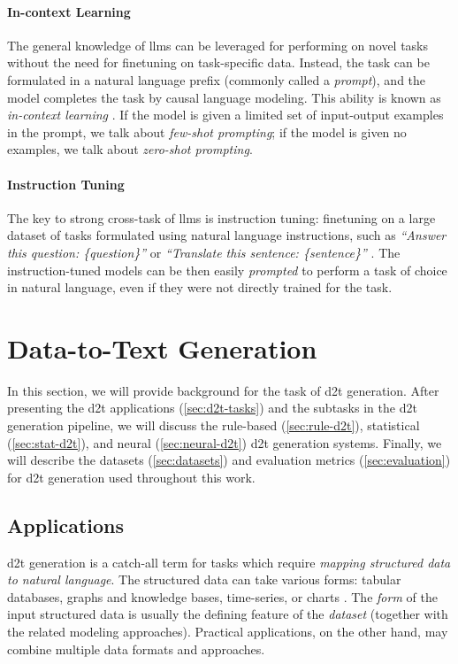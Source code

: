 \paragraph{In-context Learning} The general knowledge of \acp{llm} can be leveraged for performing on novel tasks without the need for finetuning on task-specific data. Instead, the task can be formulated in a natural language prefix (commonly called a \emph{prompt}), and the model completes the task by causal language modeling. This ability is known as \emph{in-context learning} \cite{brown2020language,dong2022survey}. If the model is given a limited set of input-output examples in the prompt, we talk about \emph{few-shot prompting}; if the model is given no examples, we talk about \emph{zero-shot prompting}.

\paragraph{Instruction Tuning} The key to strong cross-task of \acp{llm} is instruction tuning: finetuning on a large dataset of tasks formulated using natural language instructions, such as \textit{``Answer this question: \{question\}''} or \textit{``Translate this sentence: \{sentence\}''} \cite{sanh2021multitask,ouyang2022training}. The instruction-tuned models can be then easily \emph{prompted} to perform a task of choice in natural language, even if   they were not directly trained for the task.



\section{Data-to-Text Generation}
\label{sec:d2t}
In this section, we will provide background for the task of \ac{d2t} generation. After presenting the \ac{d2t} applications (\autoref{sec:d2t-tasks}) and the subtasks in the \ac{d2t} generation pipeline, we will discuss the rule-based (\autoref{sec:rule-d2t}), statistical (\autoref{sec:stat-d2t}), and neural (\autoref{sec:neural-d2t}) \ac{d2t} generation systems. Finally, we will describe the datasets (\autoref{sec:datasets}) and evaluation metrics (\autoref{sec:evaluation}) for \ac{d2t} generation used throughout this work.

\subsection{Applications}
\label{sec:d2t-tasks}

\ac{d2t} generation is a catch-all term for tasks which require \emph{mapping structured data to natural language}. The structured data can take various forms: tabular databases, graphs and knowledge bases, time-series, or charts \cite{gattSurveyStateArt2018,sharmaInnovationsNeuralDatatotext2022}. The \emph{form} of the input structured data is usually the defining feature of the \emph{dataset} (together with the related modeling approaches). Practical applications, on the other hand, may combine multiple data formats and approaches.

